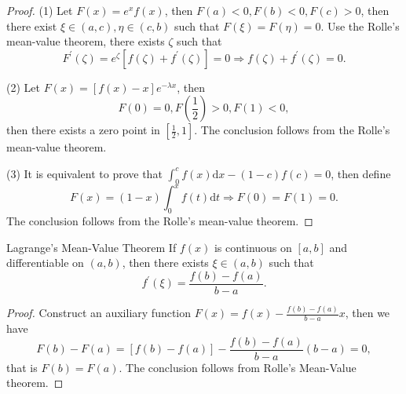 \begin{proof}
  (1) Let $F(x) = e^xf(x)$, then $F(a) < 0, F(b) < 0, F(c) > 0$,
  then there exist $\xi \in (a, c), \eta \in (c, b)$ such that
  $F(\xi) = F(\eta) = 0$.
  Use the Rolle's mean-value theorem, there exists $\zeta$ such that
  \begin{equation}
    F^{\prime}(\zeta) = e^{\zeta}[ f(\zeta) + f^{\prime}(\zeta)] = 0
    \Rightarrow f(\zeta) + f^{\prime}(\zeta) = 0.
  \end{equation}

  (2) Let $F(x) = [f(x) - x]e^{-\lambda x}$, then
  \begin{equation}
     F(0) = 0, F(\frac{1}{2}) > 0, F(1) < 0,
  \end{equation}
  then there exists a zero point in $[\frac{1}{2}, 1]$.
  The conclusion follows from the Rolle's mean-value theorem.

  (3) It is equivalent to prove that $\int_0^c f(x)\mathrm{d} x - (1-c)f(c) =
  0$,
  then define
  \begin{equation}
    F(x) = (1-x)\int_0^xf(t)\mathrm{d} t \Rightarrow
    F(0) = F(1) = 0.
  \end{equation}
  The conclusion follows from the Rolle's mean-value theorem.

\end{proof}

\begin{theorem}{Lagrange's Mean-Value Theorem}{}
  If $f(x)$ is continuous on $[a, b]$ and differentiable on $(a, b)$,
  then there exists $\xi \in (a, b)$ such that
  \begin{equation}
    f^{\prime}(\xi) = \frac{f(b) - f(a)}{b - a}.
  \end{equation}
\end{theorem}

\begin{proof}
  Construct an auxiliary function
  $F(x) = f(x) - \frac{f(b) - f(a)}{b - a}x$,
  then we have
  \begin{equation}
    F(b) - F(a) = \left[ f(b) - f(a) \right]
    - \frac{f(b) - f(a)}{b - a}(b - a) = 0,
  \end{equation}
  that is $F(b) = F(a)$.
  The conclusion follows from Rolle's Mean-Value theorem.
\end{proof}


